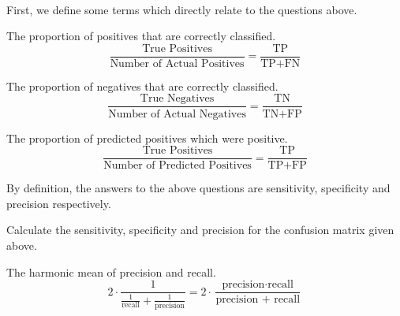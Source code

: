 \documentclass[11pt,fleqn]{book} %
\begin{document}
\noindent
\\First, we define some terms which directly relate to the questions above.\\

\begin{definition}
The proportion of positives that are correctly classified.
\begin{equation*}
	\frac{\text{True Positives}}{\text{Number of Actual Positives}} = \frac{\text{TP}}{\text{TP+FN}}
\end{equation*}
\end{definition}

\begin{definition}[Specificity]
The proportion of negatives that are correctly classified.
\begin{equation*}
	\frac{\text{True Negatives}}{\text{Number of Actual Negatives}} = \frac{\text{TN}}{\text{TN+FP}}
\end{equation*}
\end{definition}

\begin{definition}[Precision]
The proportion of predicted positives which were positive.
\begin{equation*}
	\frac{\text{True Positives}}{\text{Number of Predicted Positives}} = \frac{\text{TP}}{\text{TP+FP}}
\end{equation*}
\end{definition}

\begin{example}
	By definition, the answers to the above questions are sensitivity, specificity and precision respectively.
\end{example}

\begin{exercise}
Calculate the sensitivity, specificity and precision for the confusion matrix given above.
\end{exercise}

\begin{definition}[F1-score]
The harmonic mean of precision and recall.
\begin{equation*}
	2 \cdot \frac{1}{\frac{1}{\text{recall}} + \frac{1}{\text{precision}}}
	= 2 \cdot \frac{\text{precision} \cdot \text{recall}}{\text{precision + recall}}
\end{equation*}
\end{definition}
\end{document}

